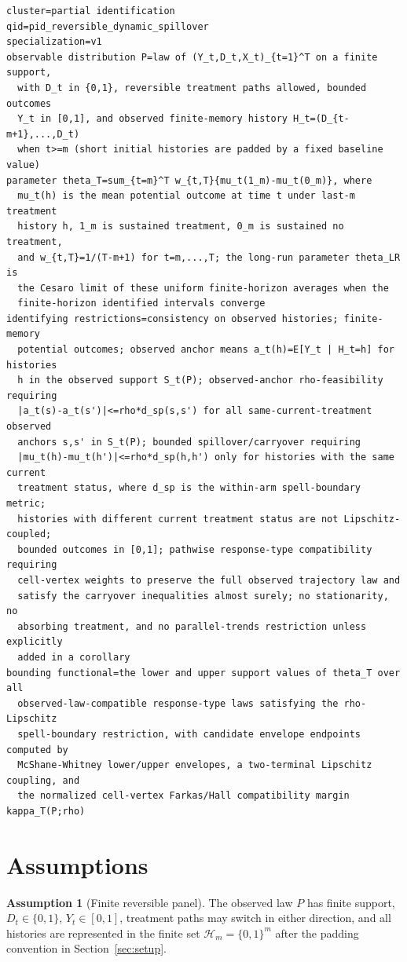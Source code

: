 \documentclass[11pt]{article}
\newcommand{\calH}{\mathcal{H}}
\theoremstyle{definition}
\newtheorem{assumption}{Assumption}
\theoremstyle{plain}
\theoremstyle{remark}
\begin{document}
\begin{verbatim}
cluster=partial identification
qid=pid_reversible_dynamic_spillover
specialization=v1
observable distribution P=law of (Y_t,D_t,X_t)_{t=1}^T on a finite support,
  with D_t in {0,1}, reversible treatment paths allowed, bounded outcomes
  Y_t in [0,1], and observed finite-memory history H_t=(D_{t-m+1},...,D_t)
  when t>=m (short initial histories are padded by a fixed baseline value)
parameter theta_T=sum_{t=m}^T w_{t,T}{mu_t(1_m)-mu_t(0_m)}, where
  mu_t(h) is the mean potential outcome at time t under last-m treatment
  history h, 1_m is sustained treatment, 0_m is sustained no treatment,
  and w_{t,T}=1/(T-m+1) for t=m,...,T; the long-run parameter theta_LR is
  the Cesaro limit of these uniform finite-horizon averages when the
  finite-horizon identified intervals converge
identifying restrictions=consistency on observed histories; finite-memory
  potential outcomes; observed anchor means a_t(h)=E[Y_t | H_t=h] for histories
  h in the observed support S_t(P); observed-anchor rho-feasibility requiring
  |a_t(s)-a_t(s')|<=rho*d_sp(s,s') for all same-current-treatment observed
  anchors s,s' in S_t(P); bounded spillover/carryover requiring
  |mu_t(h)-mu_t(h')|<=rho*d_sp(h,h') only for histories with the same current
  treatment status, where d_sp is the within-arm spell-boundary metric;
  histories with different current treatment status are not Lipschitz-coupled;
  bounded outcomes in [0,1]; pathwise response-type compatibility requiring
  cell-vertex weights to preserve the full observed trajectory law and
  satisfy the carryover inequalities almost surely; no stationarity, no
  absorbing treatment, and no parallel-trends restriction unless explicitly
  added in a corollary
bounding functional=the lower and upper support values of theta_T over all
  observed-law-compatible response-type laws satisfying the rho-Lipschitz
  spell-boundary restriction, with candidate envelope endpoints computed by
  McShane-Whitney lower/upper envelopes, a two-terminal Lipschitz coupling, and
  the normalized cell-vertex Farkas/Hall compatibility margin kappa_T(P;rho)
\end{verbatim}

\section{Assumptions}\label{sec:assumptions}
\begin{assumption}[Finite reversible panel]\label{ass:finite-panel}
The observed law \(P\) has finite support, \(D_t\in\{0,1\}\), \(Y_t\in[0,1]\), treatment paths may switch in either direction, and all histories are represented in the finite set \(\calH_m=\{0,1\}^m\) after the padding convention in Section~\ref{sec:setup}.
\end{assumption}
\end{document}
